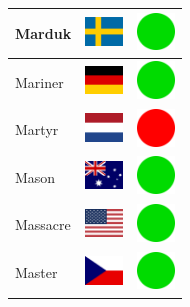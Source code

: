 \documentclass[12pt, a4paper, twoside]{report}
\begin{document}
\begin{center}
\begin{longtable}{|p{5cm}|p{2cm}|p{2cm}|}
 Marduk                                                     & \includegraphics[width=1cm]{../img/flags/se} &   \includegraphics[width=1cm]{../likes/y} \\ \hline
 Mariner                                                    & \includegraphics[width=1cm]{../img/flags/de} &   \includegraphics[width=1cm]{../likes/y} \\ \hline
 Martyr                                                     & \includegraphics[width=1cm]{../img/flags/nl} &   \includegraphics[width=1cm]{../likes/n} \\ \hline
 Mason                                                      & \includegraphics[width=1cm]{../img/flags/au} &   \includegraphics[width=1cm]{../likes/y} \\ \hline
 Massacre                                                   & \includegraphics[width=1cm]{../img/flags/us} &   \includegraphics[width=1cm]{../likes/y} \\ \hline
 Master                                                     & \includegraphics[width=1cm]{../img/flags/cz} &   \includegraphics[width=1cm]{../likes/y} \\ \hline

\end{longtable}
\end{center}
\end{document}
